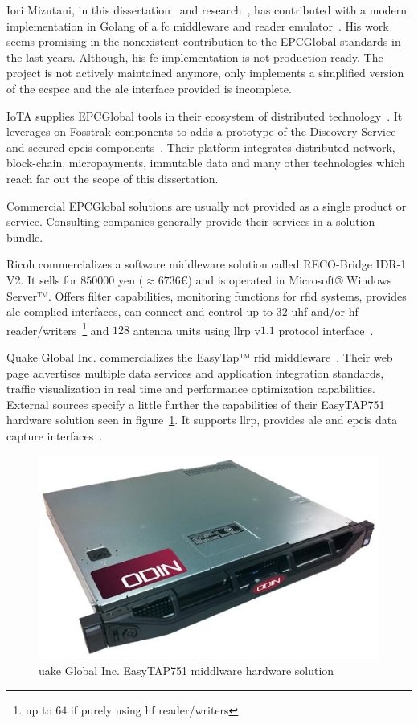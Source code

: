 Iori Mizutani, in this dissertation~\cite{mizutaniRobustHighPerformance} and research~\cite{mizutaniMulticodePortableRFID2016b}, has contributed with a modern implementation in Golang of a \ac{fc} middleware and reader emulator~\cite{mizutaniIomzGolemu2020, mizutaniIomzGosstrak2020}. 
His work seems promising in the nonexistent contribution to the EPCGlobal standards in the last years. Although, his \ac{fc} implementation is not production ready. The project is not actively maintained anymore, only implements a simplified version of the \ac{ecspec} and the \ac{ale} interface provided is incomplete.

IoTA supplies EPCGlobal tools in their ecosystem of distributed technology~\cite{GlobalTradeSupply}. It leverages on Fosstrak components to adds a prototype of the Discovery Service and secured \ac{epcis} components~\cite{FosstrakSimilarProjects}. Their platform integrates distributed network, block-chain, micropayments, immutable data and many other technologies which reach far out the scope of this dissertation.

Commercial EPCGlobal solutions are usually not provided as a single product or service. Consulting companies generally provide their services in a solution bundle.

Ricoh commercializes a software middleware solution called RECO-Bridge IDR-1 V2. It sells for $850000$ yen ($\approx 6736$€) and is operated in Microsoft® Windows Server™. Offers filter capabilities, monitoring functions for \ac{rfid} systems, provides \ac{ale}-complied interfaces, can connect and control up to $32$ \ac{uhf} and/or \ac{hf} reader/writers~\footnote{up to $64$ if purely using \ac{hf} reader/writers} and $128$ antenna units using \ac{llrp} v$1.1$ protocol interface~\cite{RECOBridgeIDR1V2}.

Quake Global Inc. commercializes the EasyTap™ \ac{rfid} middleware~\cite{EasyTAPRealTime}. Their web page advertises multiple data services and application integration standards, traffic visualization in real time and performance optimization capabilities. External sources specify a little further the capabilities of their EasyTAP751 hardware solution seen in figure~\ref{fig:easytap751}. It supports \ac{llrp}, provides \ac{ale} and \ac{epcis} data capture interfaces~\cite{RFIDEasyTAPTag}.

\begin{figure}[H]
    \centering
    \includegraphics[width=0.6\linewidth]{./figs/02-state-of-the-art/easytap751.jpg}
    \caption{uake Global Inc. EasyTAP751 middlware hardware solution~\cite{RFIDEasyTAPTag}} 
    \label{fig:easytap751}
\end{figure}

